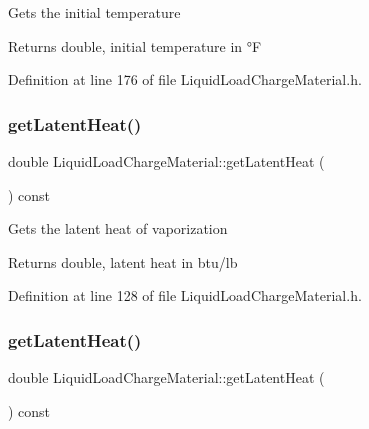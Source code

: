 Gets the initial temperature \begin{DoxyReturn}{Returns}
double, initial temperature in °F 
\end{DoxyReturn}


Definition at line 176 of file Liquid\+Load\+Charge\+Material.\+h.

\mbox{\label{class_liquid_load_charge_material_aca3a38eb3343144042e9349b053da1bc}} 
\subsubsection{\texorpdfstring{get\+Latent\+Heat()}{getLatentHeat()}\hspace{0.1cm}{\footnotesize\ttfamily [1/3]}}
{\footnotesize\ttfamily double Liquid\+Load\+Charge\+Material\+::get\+Latent\+Heat (\begin{DoxyParamCaption}{ }\end{DoxyParamCaption}) const\hspace{0.3cm}{\ttfamily [inline]}}

Gets the latent heat of vaporization \begin{DoxyReturn}{Returns}
double, latent heat in btu/lb 
\end{DoxyReturn}


Definition at line 128 of file Liquid\+Load\+Charge\+Material.\+h.

\mbox{\label{class_liquid_load_charge_material_aca3a38eb3343144042e9349b053da1bc}} 
\subsubsection{\texorpdfstring{get\+Latent\+Heat()}{getLatentHeat()}\hspace{0.1cm}{\footnotesize\ttfamily [2/3]}}
{\footnotesize\ttfamily double Liquid\+Load\+Charge\+Material\+::get\+Latent\+Heat (\begin{DoxyParamCaption}{ }\end{DoxyParamCaption}) const\hspace{0.3cm}{\ttfamily [inline]}}

